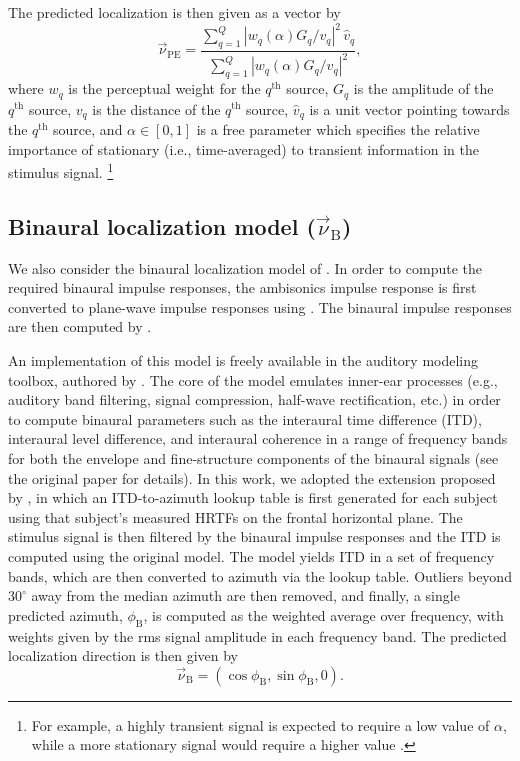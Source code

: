 The predicted localization is then given as a vector by
\begin{equation}\label{eq:PE_Energy_Vector}
\vec{\nu}_{\text{PE}} = \frac{ \displaystyle \sum_{q=1}^Q |w_q(\alpha) G_q / v_q|^2 \, \hat{v}_q}{ \displaystyle \sum_{q=1}^Q |w_q(\alpha) G_q / v_q|^2},
\end{equation}
where $w_q$ is the perceptual weight for the $q^\text{th}$ source, $G_q$ is the amplitude of the $q^\text{th}$ source, $v_q$ is the distance of the $q^\text{th}$ source, $\hat{v}_q$ is a unit vector pointing towards the $q^\text{th}$ source, and $\alpha \in [0,1]$ is a free parameter which specifies the relative importance of stationary (i.e., time-averaged) to transient information in the stimulus signal.%
\footnote{For example, a highly transient signal is expected to require a low value of $\alpha$, while a more stationary signal would require a higher value \citep{Stitt2016,Stitt2017}.}

\subsection{Binaural localization model (\texorpdfstring{$\vec{\nu}_{\text{B}}$}{vB})}\label{sec:04_Auditory_Models:Binaural_Localization_Model}
We also consider the binaural localization model of \citet{Dietz2011}.
In order to compute the required binaural impulse responses, the ambisonics impulse response is first converted to plane-wave impulse responses using .
The binaural impulse responses are then computed by .

An implementation of this model is freely available in the auditory modeling toolbox, authored by \citet{SondergaardMajdak2013}.
The core of the model \citep{Dietz2011} emulates inner-ear processes (e.g., auditory band filtering, signal compression, half-wave rectification, etc.) in order to compute binaural parameters such as the interaural time difference (ITD), interaural level difference, and interaural coherence in a range of frequency bands for both the envelope and fine-structure components of the binaural signals (see the original paper for details).
In this work, we adopted the extension proposed by \citet{Wierstorf2013}, in which an ITD-to-azimuth lookup table is first generated for each subject using that subject's measured HRTFs on the frontal horizontal plane.
The stimulus signal is then filtered by the binaural impulse responses and the ITD is computed using the original model.
The model yields ITD in a set of frequency bands, which are then converted to azimuth via the lookup table.
Outliers beyond $30^\circ$ away from the median azimuth are then removed, and finally, a single predicted azimuth, $\phi_{\text{B}}$, is computed as the weighted average over frequency, with weights given by the rms signal amplitude in each frequency band.
The predicted localization direction is then given by
\begin{equation}
\vec{\nu}_{\text{B}} = (\cos \phi_{\text{B}}, \sin \phi_{\text{B}}, 0).
\end{equation}